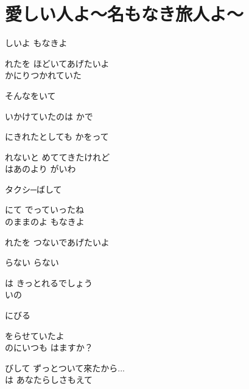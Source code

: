 \section{ 愛しい人よ～名もなき旅人よ～}
\large{

しいよ もなきよ

れたを ほどいてあげたいよ
\\

かにりつかれていた

そんなをいて

いかけていたのは かで

にきれたとしても かをって

れないと めててきたけれど
\\

はあのより がいわ

タクシ─ばして

にて でっていったね
\\

のままのよ もなきよ

れたを つないであげたいよ

らない らない

は きっとれるでしょう
\\

いの

にびる

 をらせていたよ
\\

のにいつも はますか？

びして ずっとついて來たから...
\\

は あなたらしさもえて

}
